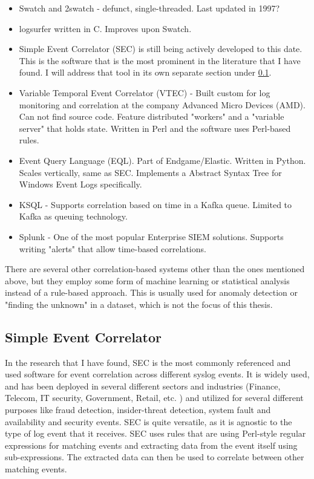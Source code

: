 \begin{itemize}
    \item Swatch and 2swatch - defunct, single-threaded. Last updated in 1997?
    \item logsurfer \cite{thompson_2017} written in C. Improves upon Swatch.
    \item Simple Event Correlator (SEC) is still being actively developed to this date. This is the software that is the most prominent in the literature that I have found. I will address that tool in its own separate section under \ref{sec:SEC}.
    \item Variable Temporal Event Correlator (VTEC) - Built custom for log monitoring and correlation at the company Advanced Micro Devices (AMD). Can not find source code. Feature distributed "workers" and a "variable server" that holds state. Written in Perl and the software uses Perl-based rules.
    \item Event Query Language (EQL). Part of Endgame/Elastic. Written in Python. Scales vertically, same as SEC. Implements a Abstract Syntax Tree for Windows Event Logs specifically.
    \item KSQL - Supports correlation based on time in a Kafka queue. Limited to Kafka as queuing technology.
    \item Splunk - One of the most popular Enterprise SIEM solutions. Supports writing "alerts" that allow time-based correlations.
\end{itemize}
There are several other correlation-based systems other than the ones mentioned above, but they employ some form of machine learning or statistical analysis instead of a rule-based approach. This is usually used for anomaly detection or "finding the unknown" in a dataset, which is not the focus of this thesis.

\subsection{Simple Event Correlator}
\label{sec:SEC}

In the research that I have found, SEC is the most commonly referenced and used software for event correlation across different syslog events. It is widely used, and has been deployed in several different sectors and industries (Finance, Telecom, IT security, Government, Retail, etc. \cite{vaarandi2005tools}) and utilized for several different purposes like fraud detection, insider-threat detection, system fault and availability and security events. SEC is quite versatile, as it is agnostic to the type of log event that it receives. SEC uses rules that are using Perl-style regular expressions for matching events and extracting data from the event itself using sub-expressions. The extracted data can then be used to correlate between other matching events.

